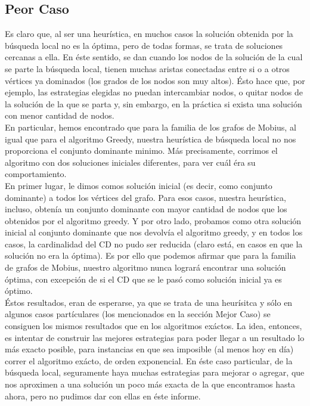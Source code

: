  \subsection{Peor Caso}
 Es claro que, al ser una heurística, en muchos casos la solución obtenida por la búsqueda local no es la óptima, pero de todas formas, se trata de soluciones cercanas a ella. En éste sentido, se dan cuando los nodos de la solución de la cual se parte la búsqueda local, tienen muchas aristas conectadas entre si o a otros vértices ya dominados (los grados de los nodos son muy altos). Ésto hace que, por ejemplo, las estrategias elegidas no puedan intercambiar nodos, o quitar nodos de la solución de la que se parta y, sin embargo, en la práctica si exista una solución con menor cantidad de nodos. \\
En particular, hemos encontrado que para la familia de los grafos de Mobius, al igual que para el algoritmo Greedy, nuestra heurística de búsqueda local no nos proporciona el conjunto dominante minimo. Más precisamente, corrimos el algoritmo con dos soluciones iniciales diferentes, para ver cuál éra su comportamiento. \\
En primer lugar, le dimos comos solución inicial (es decir, como conjunto dominante) a todos los vértices del grafo. Para esos casos, nuestra heurística, incluso, obtenía un conjunto dominante con mayor cantidad de nodos que los obtenidos por el algoritmo greedy. Y por otro lado, probamos como otra solución inicial al conjunto dominante que nos devolvía el algoritmo greedy, y en todos los casos, la cardinalidad del CD no pudo ser reducida (claro está, en casos en que la solución no era la óptima). Es por ello que podemos afirmar que para la familia de grafos de Mobius, nuestro algoritmo nunca logrará encontrar una solución óptima, con excepción de si el CD que se le pasó como solución inicial ya es óptimo. \\
Éstos resultados, eran de esperarse, ya que se trata de una heurísitca y sólo en algunos casos partículares (los mencionados en la sección Mejor Caso) se consiguen los mismos resultados que en los algoritmos exáctos. La idea, entonces, es intentar de construir las mejores estrategias para poder llegar a un resultado lo más exacto posible, para instancias en que sea imposible (al menos hoy en día) correr el algoritmo exácto, de orden exponencial. En éste caso particular, de la búsqueda local, seguramente haya muchas estrategias para mejorar o agregar, que nos aproximen a una solución un poco más exacta de la que encontramos hasta ahora, pero no pudimos dar con ellas en éste informe.


